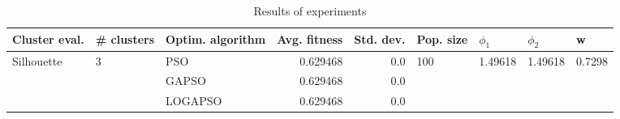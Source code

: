 \begin{table}
\centering
\caption{Results of experiments}
\begin{tabular}{lllrrllll}
\toprule
              Cluster eval. &        \# clusters & Optim. algorithm &  Avg. fitness &  Std. dev. &            Pop. size &               $\phi_{1}$ &               $\phi_{2}$ &                       w \\
\midrule
\multirow{3}{*}{Silhouette} & \multirow{3}{*}{3} &              PSO &      0.629468 &        0.0 & \multirow{3}{*}{100} & \multirow{3}{*}{1.49618} & \multirow{3}{*}{1.49618} & \multirow{3}{*}{0.7298} \\
                            &                    &            GAPSO &      0.629468 &        0.0 &                      &                          &                          &                         \\
                            &                    &          LOGAPSO &      0.629468 &        0.0 &                      &                          &                          &                         \\
\bottomrule
\end{tabular}
\end{table}
